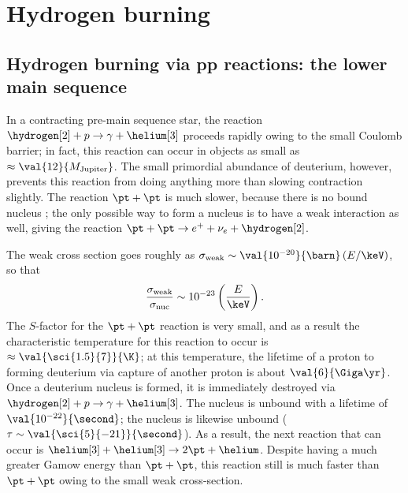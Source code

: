\section{Hydrogen burning}

\subsection{Hydrogen burning via pp reactions: the lower main sequence}

In a contracting pre-main sequence star, the reaction $\hydrogen[2]+p\to\gamma+\helium[3]$ proceeds rapidly owing to the small Coulomb barrier; in fact, this reaction can occur in objects as small as $\approx \val{12}{M_{\mathrm{Jupiter}}}$.  The small primordial abundance of deuterium, however, prevents this reaction from doing anything more than slowing contraction slightly.  The reaction $\pt +\pt$ is much slower, because there is no bound nucleus \helium[2]; the only possible way to form a nucleus is to have a weak interaction as well, giving the reaction $\pt+\pt\to e^{+}+\nu_{e}+\hydrogen[2]$.

The weak cross section goes roughly as $\sigma_{\mathrm{weak}} \sim \val{10^{-20}}{\barn}\left(E/\keV\right)$, so that
\[ \frac{\sigma_{\mathrm{weak}}}{\sigma_{\mathrm{nuc}}} \sim 10^{-23}\left(\frac{E}{\keV}\right). \]
The $S$-factor for the $\pt+\pt$ reaction is very small, and as a result the characteristic temperature for this reaction to occur is $\approx \val{\sci{1.5}{7}}{\K}$; at this temperature, the lifetime of a proton to forming deuterium via capture of another proton is about $\val{6}{\Giga\yr}$.  Once a deuterium nucleus is formed, it is immediately destroyed via $\hydrogen[2]+p\to\gamma+\helium[3]$. The nucleus \lithium[4] is unbound with a lifetime of $\val{10^{-22}}{\second}$; the nucleus \beryllium[6] is likewise unbound ($\tau \sim \val{\sci{5}{-21}}{\second}$). As a result, the next reaction that can occur is $\helium[3]+\helium[3]\to 2\pt+\helium$.  Despite having a much greater Gamow energy than $\pt + \pt$, this reaction still is much faster than $\pt+\pt$ owing to the small weak cross-section.

